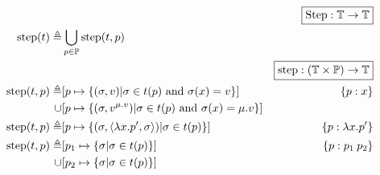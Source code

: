 \documentclass{article}
\begin{document}
\begin{align*}
                             &                                                                                                                                                                                                       & \fbox{$\Step:\mathbb{T}\rightarrow\mathbb{T}$}                   \\
  \step(\ptree)   \triangleq & \bigcup_{p\in\mathbb{P}}\step(\ptree,p)                                                                                                                                                                                                                                  \\
                             &                                                                                                                                                                                                       & \fbox{$\step:(\mathbb{T}\times\mathbb{P})\rightarrow\mathbb{T}$} \\
  \step(\ptree,p) \triangleq & [p\mapsto\{(\ctx,v)|\ctx\in \ptree(p)\text{ and }\ctx(x)=v\}]                                                                                                                                         & \plabel{p}{x}                                                    \\
  \cup                       & [p\mapsto\{(\ctx,\openloc{\mu.v}{v})|\ctx\in \ptree(p)\text{ and }\ctx(x)=\mu.v\}]                                                                                                                                                                                       \\
  \step(\ptree,p) \triangleq & [p\mapsto\{(\ctx,\langle\lambda x.p',\ctx\rangle)|\ctx\in \ptree(p)\}]                                                                                                                                & \plabel{p}{\lambda x.p'}                                         \\
  \step(\ptree,p) \triangleq & [p_1\mapsto\{\ctx|\ctx\in \ptree(p)\}]                                                                                                                                                                & \plabel{p}{p_1\:p_2}                                             \\
  \cup                       & [p_2\mapsto\{\ctx|\ctx\in \ptree(p)\}]                                                                                                                                                                                                                                   \\

\end{align*}
\end{document}
